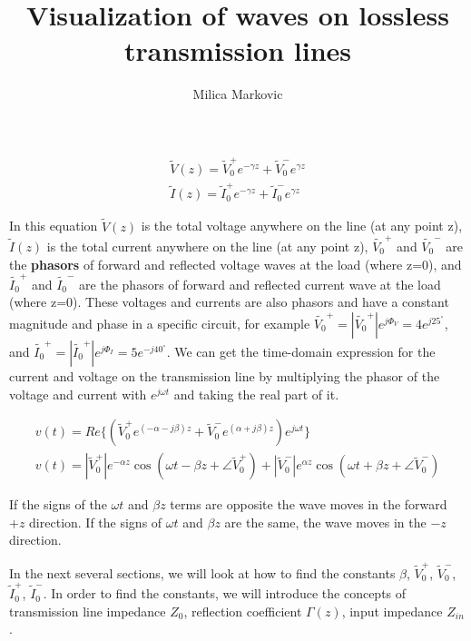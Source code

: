 \documentclass{ximera}
\title{Visualization of waves on lossless  transmission lines}
\author{Milica Markovic}
\begin{document}
  
\begin{abstract}  

\end{abstract}  
\maketitle    


\begin{eqnarray}
\tilde{V}(z)=\tilde{V}_0^+ e^{-\gamma z} + \tilde{V}_0^- e^{\gamma z} \nonumber \\ \nonumber
\tilde{I}(z)=\tilde{I}_0^+ e^{-\gamma z} + \tilde{I}_0^- e^{\gamma z}
\end{eqnarray}

In this equation $\tilde{V}(z)$ is the total voltage anywhere on the line (at any point z), $\tilde{I}(z)$ is the total current anywhere on the line (at any point z), $\tilde{V_0}^+$ and $\tilde{V_0}^-$ are the {\bf
phasors} of forward and
reflected voltage waves at the load (where z=0), and $\tilde{I_0}^+$ and $\tilde{I_0}^-$ are the phasors of forward and
reflected current wave at the load (where z=0). These voltages and currents are also phasors and have a constant magnitude and phase in a specific circuit, for example $\tilde{V_0}^+=|\tilde{V_0}^+|e^{j\Phi_V}=4e^{j25^\circ}$, and $\tilde{I_0}^+=|\tilde{I_0}^+|e^{j\Phi_I}=5e^{-j40^\circ}$.
We can get the time-domain expression for the current and voltage on the
transmission line by multiplying the phasor of the voltage and current with $e^{j \omega t}$ and taking the real part of it.

\begin{eqnarray}
v(t)=Re\{ (\tilde{V}_0^+  e^{(-\alpha - j \beta) z} + \tilde{V}_0^- e^{(\alpha + j
 \beta) z})e^{j \omega t} \}  \nonumber \\ 
v(t)=|\tilde{V}_0^+| e^{ - \alpha z} \cos(\omega t - \beta z + \angle \tilde{V}_0^+)+
|\tilde{V}_0^-|e^{\alpha z} \cos(\omega t + \beta z + \angle \tilde{V}_0^-) \label{tdeq}
\end{eqnarray}

If the signs of the $\omega t$ and
$\beta z$ terms are opposite the wave moves in the forward $+z$
direction. If the signs of $\omega t$ and $\beta z$ are the same, the
wave moves in the $-z$ direction.

In the next several sections, we will look at how to find the constants $\beta$, $\tilde{V}_0^+  $, $ \tilde{V}_0^-$, $\tilde{I}_0^+ $, $\tilde{I}_0^-$. In order to find the constants, we will introduce the concepts of transmission line impedance $Z_0$, reflection coefficient $\Gamma(z)$, input impedance $Z_{in}$. 
\end{document}
